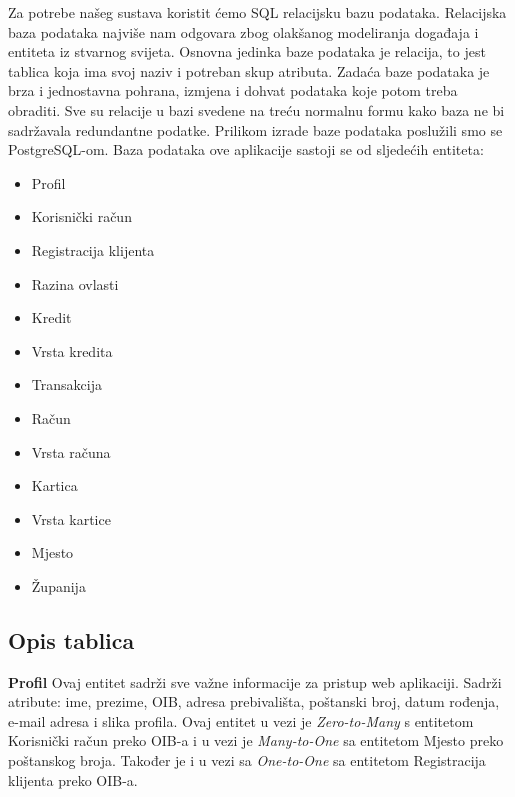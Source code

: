 			
		Za potrebe našeg sustava koristit ćemo SQL relacijsku bazu podataka. Relacijska baza podataka najviše nam odgovara zbog olakšanog modeliranja događaja i entiteta iz stvarnog svijeta. Osnovna jedinka baze podataka je relacija, to jest tablica koja ima svoj naziv i potreban skup atributa. Zadaća baze podataka je brza i jednostavna pohrana, izmjena i dohvat podataka koje potom treba obraditi. Sve su relacije u bazi svedene na treću normalnu formu kako baza ne bi sadržavala redundantne podatke. Prilikom izrade baze podataka poslužili smo se PostgreSQL-om.
		Baza podataka ove aplikacije sastoji se od sljedećih entiteta:
		\begin{itemize}
			\item 	Profil
			\item 	Korisnički račun
			\item 	Registracija klijenta
			\item   Razina ovlasti
			\item   Kredit
			\item   Vrsta kredita
			\item   Transakcija
			\item   Račun
			\item   Vrsta računa
			\item   Kartica
			\item   Vrsta kartice	
			\item   Mjesto
			\item   Županija	
		\end{itemize}
		
		\eject
		
			\subsection{Opis tablica}
			

				\textbf{Profil} Ovaj entitet sadrži sve važne informacije za pristup web aplikaciji. Sadrži atribute: ime, prezime, OIB, adresa prebivališta, poštanski broj, datum rođenja, e-mail adresa i slika profila. Ovaj entitet u vezi je \textit{Zero-to-Many} s entitetom Korisnički račun preko OIB-a i u vezi je \textit{Many-to-One} sa entitetom Mjesto preko poštanskog broja. Također je i u vezi sa \textit{One-to-One} sa entitetom Registracija klijenta preko OIB-a.
				
